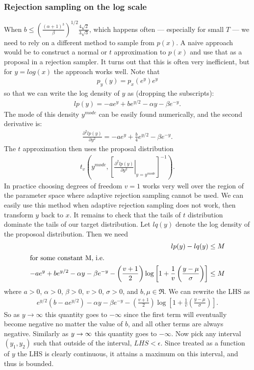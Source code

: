\documentclass{article}
\begin{document}
\subsubsection{Rejection sampling on the log scale}
When $b \leq \left(\frac{(\alpha + 1)^3}{\beta}\right)^{1/2}\frac{4\sqrt{2}}{3\sqrt{3}}$, which happens often --- especially for small $T$ --- we need to rely on a different method to sample from $p(x)$. A naive approach would be to construct a normal or $t$ approximation to $p(x)$ and use that as a proposal in a rejection sampler. It turns out that this is often very inefficient, but for $y=log(x)$ the approach works well. Note that
\begin{align*}
  p_y(y) = p_x(e^y)e^y
\end{align*}
so that we can write the log density of $y$ as (dropping the subscripts):
\begin{align*}
  lp(y) = -ae^y + be^{y/2} - \alpha y - \beta e^{-y}.
\end{align*}
The mode of this density $y^{mode}$ can be easily found numerically, and the second derivative is:
\begin{align*}
  \frac{\partial^2 lp(y)}{\partial y^2} = -ae^y + \frac{b}{4}e^{y/2} - \beta e^{-y}.
\end{align*}
The $t$ approximation then uses the proposal distribution 
\begin{align*}
  t_{v}\left(y^{mode}, \left[\left.\frac{\partial^2 lp(y)}{\partial y^2}\right|_{y=y^{mode}}\right]^{-1}\right).
\end{align*}
In practice choosing degrees of freedom $v=1$ works very well over the region of the parameter space where adaptive rejection sampling cannot be used. We can easily use this method when adaptive rejection sampling does not work, then transform $y$ back to $x$. It remains to check that the tails of $t$ distribution dominate the tails of our target distribution. Let $lq(y)$ denote the log density of the proposoal distribution. Then we need
\begin{align*}
  lp(y) - lq(y) \leq M\\
  \intertext{for some constant M, i.e.}
  -ae^y + be^{y/2} - \alpha y - \beta e^{-y} -\left(\frac{v+1}{2}\right)\log\left[1 + \frac{1}{v}\left(\frac{y-\mu}{\sigma}\right)\right]\leq M
\end{align*}
where $a>0$, $\alpha>0$, $\beta>0$, $v>0$, $\sigma>0$, and $b,\mu\in \Re$. We can rewrite the LHS as
\begin{align*}
    e^{y/2}(b-ae^{y/2}) - \alpha y - \beta e^{-y} -\left(\frac{v+1}{2}\right)\log\left[1 + \frac{1}{v}\left(\frac{y-\mu}{\sigma}\right)\right].
\end{align*}
So as $y\to\infty$ this quantity goes to $-\infty$ since the first term will eventually become negative no matter the value of $b$, and all other terms are always negative. Similarly as $y\to\-\infty$ this quantity goes to $-\infty$. Now pick any interval $(y_1,y_2)$ such that outside of the interval, $LHS<\epsilon$. Since treated as a function of $y$ the LHS is clearly continuous, it attains a maximum on this interval, and thus is bounded.
\end{document}
